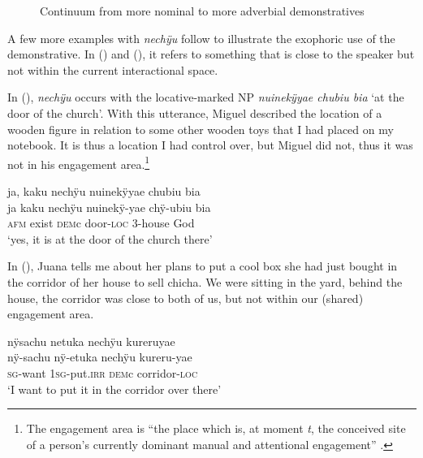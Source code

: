 \begin{figure}[!ht]
\centering
{}
\caption{Continuum from more nominal to more adverbial demonstratives}
\label{fig:ContinuumDEMs}
\end{figure}

A few more examples with \textit{nechÿu} follow to illustrate the exophoric use of the demonstrative. In () and (), it refers to something that is close to the speaker but not within the current interactional space. 

In (), \textit{nechÿu} occurs with the locative-marked NP \textit{nuinekÿyae chubiu bia} ‘at the door of the church’. With this utterance, Miguel described the location of a wooden figure in relation to some other wooden toys that I had placed on my notebook. It is thus a location I had control over, but Miguel did not, thus it was not in his engagement area.\footnote{The engagement area is “the place which is, at moment \textit{t}, the conceived site of a person’s currently dominant manual and attentional engagement” \citep[89]{Enfield2003}.}

\ea\label{ex:demC-1}
\begingl
\glpreamble ja, kaku nechÿu nuinekÿyae chubiu bia\\
\gla ja kaku nechÿu nuinekÿ-yae chÿ-ubiu bia\\
\glb \textsc{afm} exist \textsc{dem}c door-\textsc{loc} 3-house God\\
\glft ‘yes, it is at the door of the church there’
\endgl
\trailingcitation{[mox-e110914l-1.076]}
\xe

In (), Juana tells me about her plans to put a cool box she had just bought in the corridor of her house to sell chicha. We were sitting in the yard, behind the house, the corridor was close to both of us, but not within our (shared) engagement area.

\ea\label{ex:demC-5}
\begingl
\glpreamble nÿsachu netuka nechÿu kureruyae\\
\gla nÿ-sachu nÿ-etuka nechÿu kureru-yae\\
\textsc{sg}-want 1\textsc{sg}-put.\textsc{irr} \textsc{dem}c corridor-\textsc{loc}\\
\glft ‘I want to put it in the corridor over there’
\endgl
\trailingcitation{[jxx-e110923l-2.111]}
\xe

